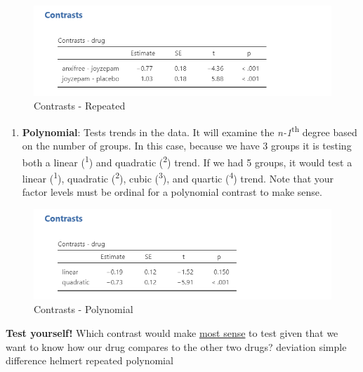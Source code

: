 \documentclass[
]{book}
\providecommand{\tightlist}{%
  \setlength{\itemsep}{0pt}\setlength{\parskip}{0pt}}
\begin{document}
\begin{figure}

{\centering \includegraphics[width=1\linewidth]{images/04_one-way-anova/contrasts_repeated} 

}

\caption{Contrasts - Repeated}\label{fig:unnamed-chunk-5}
\end{figure}

\begin{enumerate}
\def\labelenumi{\arabic{enumi}.}
\setcounter{enumi}{5}
\tightlist
\item
  \textbf{Polynomial}: Tests trends in the data. It will examine the \emph{n-1}\textsuperscript{th} degree based on the number of groups. In this case, because we have 3 groups it is testing both a linear (\textsuperscript{1}) and quadratic (\textsuperscript{2}) trend. If we had 5 groups, it would test a linear (\textsuperscript{1}), quadratic (\textsuperscript{2}), cubic (\textsuperscript{3}), and quartic (\textsuperscript{4}) trend. Note that your factor levels must be ordinal for a polynomial contrast to make sense.
\end{enumerate}

\begin{figure}

{\centering \includegraphics[width=1\linewidth]{images/04_one-way-anova/contrasts_polynomial} 

}

\caption{Contrasts - Polynomial}\label{fig:unnamed-chunk-6}
\end{figure}

\textbf{Test yourself!} Which contrast would make \underline{most sense} to test given that we want to know how our drug compares to the other two drugs? deviation simple difference helmert repeated polynomial
\end{document}
